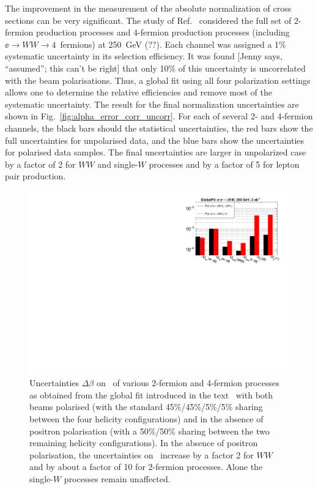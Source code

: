 The improvement in the measurement of the absolute normalization of cross sections can be very significant.  The study of Ref.~\cite{bib:PhDRobert} considered the full set of 2-fermion production processes and 4-fermion production processes (including $\ee\to WW\to 4$~fermions) at 250~GeV (??).   Each channel was assigned a 1\% systematic uncertainty in its selection efficiency.    It was found [Jenny says, ``assumed''; this can't be right]  that only 10\% of this uncertainty is uncorrelated with the beam polarisations.   Thus, a global fit using all four
polarization settings allows one to determine the relative efficiencies and remove most of the systematic uncertainty.  The result for the final normalization uncertainties are shown in 
Fig.~\ref{fig:alpha_error_corr_uncorr}.  For each of several 2- and 4-fermion channels, the black bars should the statistical uncertainties, the red bars show the full uncertainties for unpolarised data, and the blue bars show the uncertainties for polarised data samples.   The final uncertainties are larger in unpolarized case by a factor of 2 for $WW$ and single-$W$ processes and by a factor of 5 for lepton pair production.

\begin{figure}
\centering
\includegraphics[width=0.95\linewidth]{./chapters/figures/beta_precision_upolarized.pdf}
		
\caption{Uncertainties $\Delta \beta$ on \ALR\ of various 2-fermion and 4-fermion processes as obtained from the global fit introduced in the text~\cite{bib:PhDRobert} with both beams polarised (with the standard 45\%/45\%/5\%/5\% sharing between the four helicity configurations) and in the absence of positron polarisation (with a 50\%/50\% sharing between the two remaining helicity configurations). In the absence of positron polarisation, the  uncertainties on \ALR\ increase by a factor 2 for $WW$ and by about a factor of 10 for 2-fermion processes. Alone the single-$W$ processes remain unaffected.}
\label{fig:beta_error_noposipol}
\end{figure}


